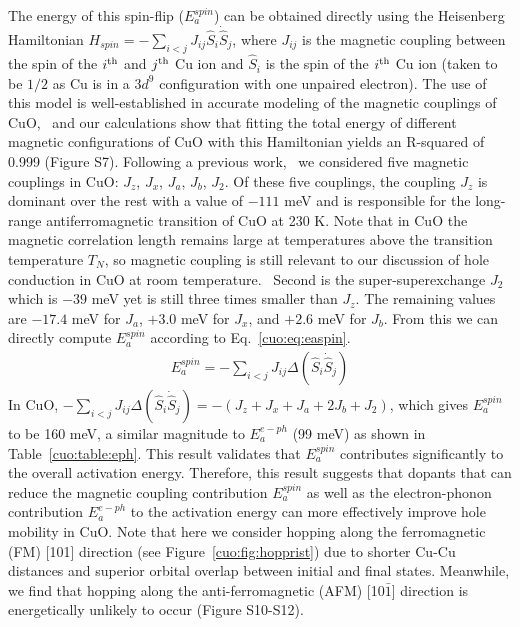 The energy of this spin-flip ($E_a^{spin}$) can be obtained directly using the Heisenberg Hamiltonian $H_{spin}=-\sum_{i<j}J_{ij}\hat{S}_i\dot \hat{S}_j$, where $J_{ij}$ is the magnetic coupling between the spin of the $i^{\rm th}$ and $j^{\rm th}$ Cu ion and $\hat{S}_i$ is the spin of the $i^{\rm th}$ Cu ion (taken to be $1/2$ as Cu is in a $3d^9$ configuration with one unpaired electron). The use of this model is well-established in accurate modeling of the magnetic couplings of CuO,~\cite{rocquefelte2010short,rocquefelte2012theoretical,rocquefelte2013room} and our calculations show that fitting the total energy of different magnetic configurations of CuO with this Hamiltonian yields an R-squared of 0.999 (Figure S7). Following a previous work,~\cite{rocquefelte2010short} we considered five magnetic couplings in CuO: $J_z$, $J_x$, $J_a$, $J_b$, $J_2$. Of these five couplings, the coupling $J_z$ is dominant over the rest with a value of $-111$ meV and is responsible for the long-range antiferromagnetic transition of CuO at 230 K. Note that in CuO the magnetic correlation length remains large at temperatures above the transition temperature $T_N$, so magnetic coupling is still relevant to our discussion of hole conduction in CuO at room temperature.~\cite{zheng2001evidence,yang1989magnetic}
Second is the super-superexchange $J_2$ which is $-39$ meV yet is still three times smaller than $J_z$. The remaining values are $-17.4$ meV for $J_a$, $+3.0$ meV for $J_x$, and $+2.6$ meV for $J_b$. From this we can directly compute $E_a^{spin}$ according to Eq.~\ref{cuo:eq:easpin}.
\begin{align}
    E_a^{spin} = -\sum_{i<j}J_{ij} \Delta \left(\hat{S}_i\dot \hat{S}_j\right)
    \label{cuo:eq:easpin}
\end{align}
In CuO, $-\sum_{i<j}J_{ij} \Delta \left(\hat{S}_i\dot \hat{S}_j\right) = -(J_z+J_x+J_a+2J_b+J_2)$, which gives $E_a^{spin}$ to be 160 meV, a similar magnitude to $E_a^{e-ph}$ (99 meV) as shown in Table~\ref{cuo:table:eph}. This result validates that $E_a^{spin}$ contributes significantly to the overall activation energy. Therefore, this result suggests that dopants that can reduce the magnetic coupling contribution $E_a^{spin}$ as well as the electron-phonon contribution $E_a^{e-ph}$ to the activation energy can more effectively improve hole mobility in CuO.
Note that here we consider hopping along the ferromagnetic (FM) [101] direction (see Figure~\ref{cuo:fig:hopprist}) due to shorter Cu-Cu distances and superior orbital overlap between initial and final states. Meanwhile, we find that hopping along the anti-ferromagnetic (AFM) [10$\bar{1}$] direction is energetically unlikely to occur (Figure S10-S12).


